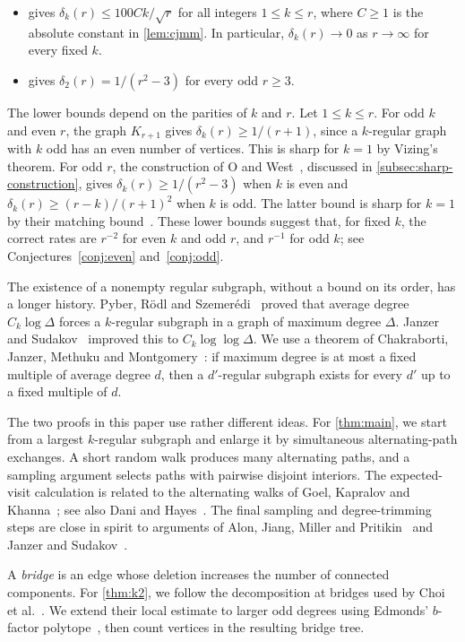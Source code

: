 \documentclass[11pt]{amsart}
\theoremstyle{remark}
\begin{document}
\begin{itemize}
\item {} gives $\delta_k(r)\le100Ck/\sqrt r$ for all integers $1\le k\le r$, where $C\ge1$ is the absolute constant in \cref{lem:cjmm}. In particular, $\delta_k(r)\to0$ as $r\to\infty$ for every fixed $k$.
\item {} gives $\delta_2(r)=1/(r^2-3)$ for every odd $r\ge3$.
\end{itemize}

The lower bounds depend on the parities of $k$ and $r$. Let $1\le k\le r$. For odd $k$ and even $r$, the graph $K_{r+1}$ gives $\delta_k(r)\ge1/(r+1)$, since a $k$-regular graph with $k$ odd has an even number of vertices. This is sharp for $k=1$ by Vizing's theorem. For odd $r$, the construction of O and West~\cite{OW2010}, discussed in \cref{subsec:sharp-construction}, gives $\delta_k(r)\ge1/(r^2-3)$ when $k$ is even and $\delta_k(r)\ge(r-k)/(r+1)^2$ when $k$ is odd. The latter bound is sharp for $k=1$ by their matching bound~\cite[Theorem~2.1]{OW2011}. These lower bounds suggest that, for fixed $k$, the correct rates are $r^{-2}$ for even $k$ and odd $r$, and $r^{-1}$ for odd $k$; see Conjectures~\ref{conj:even} and~\ref{conj:odd}.

The existence of a nonempty regular subgraph, without a bound on its order, has a longer history. Pyber, R\"odl and Szemer\'edi~\cite{PRS1995} proved that average degree $C_k\log\Delta$ forces a $k$-regular subgraph in a graph of maximum degree $\Delta$. Janzer and Sudakov~\cite{JS2023} improved this to $C_k\log\log\Delta$. We use a theorem of Chakraborti, Janzer, Methuku and Montgomery~\cite[Theorem~1.13]{CJMM2026}: if maximum degree is at most a fixed multiple of average degree $d$, then a $d'$-regular subgraph exists for every $d'$ up to a fixed multiple of $d$.

The two proofs in this paper use rather different ideas. For \cref{thm:main}, we start from a largest $k$-regular subgraph and enlarge it by simultaneous alternating-path exchanges. A short random walk produces many alternating paths, and a sampling argument selects paths with pairwise disjoint interiors. The expected-visit calculation is related to the alternating walks of Goel, Kapralov and Khanna~\cite{GKK2013}; see also Dani and Hayes~\cite{DH2025}. The final sampling and degree-trimming steps are close in spirit to arguments of Alon, Jiang, Miller and Pritikin~\cite{AJMP2003} and Janzer and Sudakov~\cite{JS2023}.

A \emph{bridge} is an edge whose deletion increases the number of connected components. For \cref{thm:k2}, we follow the decomposition at bridges used by Choi et al.~\cite{CKKPW2019}. We extend their local estimate to larger odd degrees using Edmonds' $b$-factor polytope~\cite{Edmonds1965}, then count vertices in the resulting bridge tree.
\end{document}
